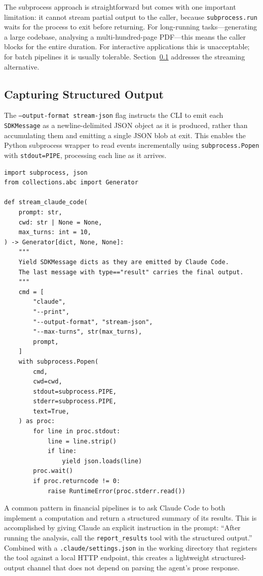 The subprocess approach is straightforward but comes with one important limitation:
it cannot stream partial output to the caller, because \texttt{subprocess.run} waits
for the process to exit before returning. For long-running tasks---generating a large
codebase, analysing a multi-hundred-page PDF---this means the caller blocks for the
entire duration. For interactive applications this is unacceptable; for batch pipelines
it is usually tolerable. Section~\ref{app:sdk-commercial:cc-sdk:output} addresses the
streaming alternative.

\subsection{Capturing Structured Output}
\label{app:sdk-commercial:cc-sdk:output}

The \texttt{--output-format stream-json} flag instructs the CLI to emit each
\texttt{SDKMessage} as a newline-delimited JSON object as it is produced, rather than
accumulating them and emitting a single JSON blob at exit. This enables the Python
subprocess wrapper to read events incrementally using \texttt{subprocess.Popen} with
\texttt{stdout=PIPE}, processing each line as it arrives.

\begin{verbatim}
import subprocess, json
from collections.abc import Generator

def stream_claude_code(
    prompt: str,
    cwd: str | None = None,
    max_turns: int = 10,
) -> Generator[dict, None, None]:
    """
    Yield SDKMessage dicts as they are emitted by Claude Code.
    The last message with type=="result" carries the final output.
    """
    cmd = [
        "claude",
        "--print",
        "--output-format", "stream-json",
        "--max-turns", str(max_turns),
        prompt,
    ]
    with subprocess.Popen(
        cmd,
        cwd=cwd,
        stdout=subprocess.PIPE,
        stderr=subprocess.PIPE,
        text=True,
    ) as proc:
        for line in proc.stdout:
            line = line.strip()
            if line:
                yield json.loads(line)
        proc.wait()
        if proc.returncode != 0:
            raise RuntimeError(proc.stderr.read())
\end{verbatim}

A common pattern in financial pipelines is to ask Claude Code to both implement a
computation and return a structured summary of its results. This is accomplished by
giving Claude an explicit instruction in the prompt: ``After running the analysis,
call the \texttt{report\_results} tool with the structured output.'' Combined with
a \texttt{.claude/settings.json} in the working directory that registers the tool
against a local HTTP endpoint, this creates a lightweight structured-output channel
that does not depend on parsing the agent's prose response.

